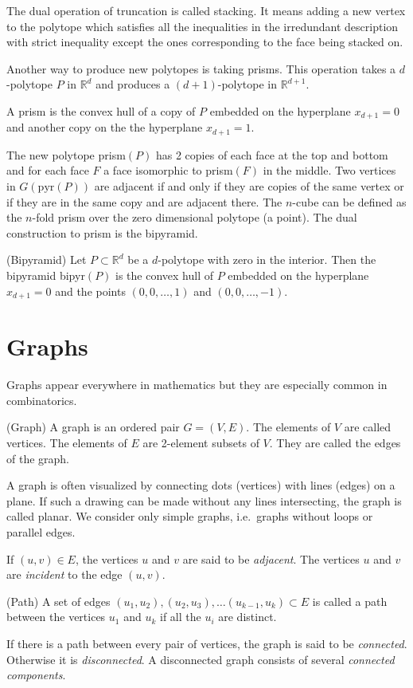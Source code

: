 The dual operation of truncation is called stacking. 
It means adding a new vertex to the polytope which satisfies all the 
inequalities in the irredundant description with strict inequality except the 
ones corresponding to the face being stacked on.

Another way to produce new polytopes is taking prisms. This operation takes a 
$d$-polytope $P$ in $\mathbb{R}^d$ and produces a $(d+1)$-polytope in 
$\mathbb{R}^{d+1}$. 
\begin{definition}
 A prism is the convex hull of a copy of $P$ embedded on the hyperplane 
$x_{d+1} = 0$ and another copy on the the hyperplane $x_{d+1} = 1$.
\end{definition}

 The new polytope prism$(P)$ has 2 copies of 
each face at the top and bottom and for each face $F$ a face isomorphic to 
prism$(F)$ in the middle. Two vertices in $G(\text{pyr}(P))$ are adjacent if and only if
they are copies of the same vertex or if they are in the same copy and are 
adjacent there. 
The $n$-cube can be defined as the $n$-fold 
prism over the zero dimensional polytope (a point). The dual construction to prism 
is the bipyramid. 
\begin{definition}
 (Bipyramid) Let $P\subset \mathbb{R}^d$ be a $d$-polytope with zero in the 
interior. Then the bipyramid bipyr$(P)$ is the convex hull of $P$ embedded on 
the hyperplane $x_{d+1} = 0$ and the points $(0,0,\dots, 1)$ and $(0,0,\dots, 
-1)$.
\end{definition}

\section{Graphs}

Graphs appear everywhere in mathematics but they are especially common in 
combinatorics. 

\begin{definition}
(Graph) A graph is an ordered pair $G=(V,E)$. The elements of $V$ are called 
vertices. The elements of $E$ are 2-element subsets of $V$. They are called 
the edges of the graph. 
\end{definition}
A graph is often visualized by connecting dots (vertices) with lines (edges) on a plane. 
If such a drawing can be made without any lines intersecting, the graph is called
planar.
We consider only simple graphs, i.e.\ graphs without loops or parallel 
edges.

If $(u,v) \in E$, the vertices $u$ and $v$ are said to be \textit{adjacent}. 
The vertices $u$ and $v$ are \textit{incident} to the edge $(u,v)$. 
\begin{definition}
 (Path) A set of edges $(u_1, u_2), (u_2, u_3), \dots (u_{k-1}, u_k) \subset E$ 
is called a path between the vertices $u_1$ and $u_k$ if all the $u_i$ are 
distinct.
\end{definition}
If there is a path between every pair of vertices, the graph is said to be 
\textit{connected}. Otherwise it is \textit{disconnected}. A disconnected graph 
consists of several \textit{connected components}.

